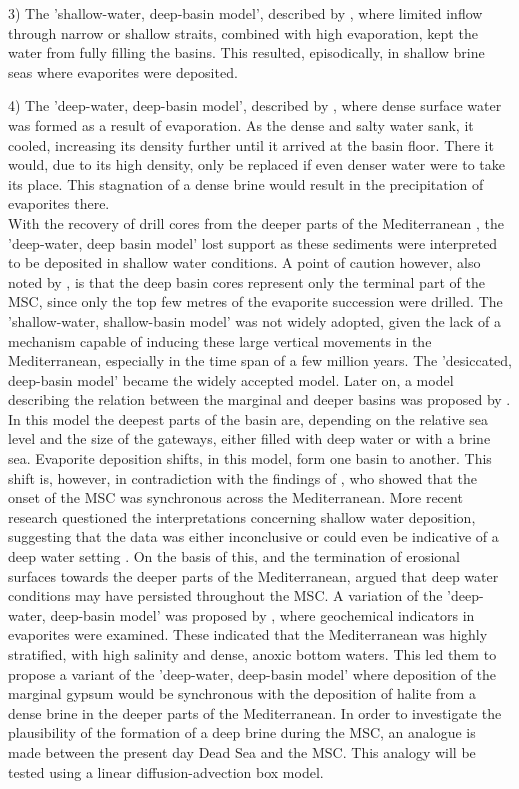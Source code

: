 \documentclass[twocolumn]{article}
\begin{document}
3) The 'shallow-water, deep-basin model', described by \cite{rouchy2006messinian}, where limited inflow through narrow or shallow straits, combined with high evaporation, kept the water from fully filling the basins. This resulted, episodically, in shallow brine seas where evaporites were deposited. 

4) The 'deep-water, deep-basin model', described by \cite{schmalz1969deep}, where dense surface water was formed as a result of evaporation. As the dense and salty water sank, it cooled, increasing its density further until it arrived at the basin floor. There it would, due to its high density, only be replaced if even denser water were to take its place. This stagnation of a dense brine would result in the precipitation of evaporites there.\\

With the recovery of drill cores from the deeper parts of the Mediterranean \citep{hsu1972origin}, the 'deep-water, deep basin model' lost support as these sediments were interpreted to be deposited in shallow water conditions. A point of caution however, also noted by \cite{nesteroff1973mineralogy}, is that the deep basin cores represent only the terminal part of the MSC, since only the top few metres of the evaporite succession were drilled. The 'shallow-water, shallow-basin model' was not widely adopted, given the lack of a mechanism capable of inducing these large vertical movements in the Mediterranean, especially in the time span of a few million years. The 'desiccated, deep-basin model' became the widely accepted model. 
Later on, a model describing the relation between the marginal and deeper basins was proposed by \cite{rouchy2006messinian}. In this model the deepest parts of the basin are, depending on the relative sea level and the size of the gateways, either filled with deep water or with a brine sea. Evaporite deposition shifts, in this model, form one basin to another. This shift is, however, in contradiction with the findings of \cite{krijgsman2002onset}, who showed that the onset of the MSC was synchronous across the Mediterranean. 
More recent research questioned the interpretations concerning shallow water deposition, suggesting that the data was either inconclusive or could even be indicative of a deep water setting \citep{hardie2004did, roveri2001mediterranean}. On the basis of this, and the termination of erosional surfaces towards the deeper parts of the Mediterranean, \cite{roveri2014messinian} argued that deep water conditions may have persisted throughout the MSC. 
A variation of the 'deep-water, deep-basin model' was proposed by \cite{garcia2018geochemical}, where geochemical indicators in evaporites were examined. These indicated that the Mediterranean was highly stratified, with high salinity and dense, anoxic bottom waters. This led them to propose a variant of the 'deep-water, deep-basin model' where deposition of the marginal gypsum would be synchronous with the deposition of halite from a dense brine in the deeper parts of the Mediterranean. In order to investigate the plausibility of the formation of a deep brine during the MSC, an analogue is made between the present day Dead Sea and the MSC. This analogy will be tested using a linear diffusion-advection box model.
\end{document}
